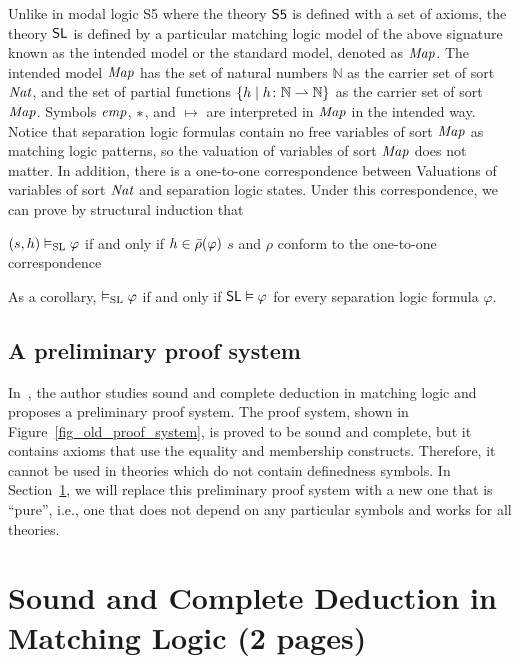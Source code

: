 \documentclass{amsart}
\begin{document}
\newcommand{\N}{\mathbb{N}}

Unlike in modal logic S5 where the theory $\MLSfive$ is defined with a set of
axioms,
the theory $\MLSL$ is defined by 
a particular matching logic model 
of the above signature
known as the intended model or the standard model, denoted as $\Map$.
The intended model $\Map$ has the set of natural numbers $\N$ as the carrier
set of sort $\Nat$,
and the set of partial functions 
$ \{ h \mid h \colon \N \pto \N \} $
as the carrier set of sort $\Map$.
Symbols $\emp$, $\merge$, and $\mapsto$ are interpreted in $\Map$ in the
intended way.
Notice that separation logic formulas contain no free variables of sort $\Map$
as matching logic patterns,
so the valuation of variables of sort $\Map$ does not matter.
In addition, there is a one-to-one correspondence between 
Valuations of variables of sort $\Nat$ and separation logic states.
Under this correspondence, we can prove by structural induction that
\begin{center}
$(s,h) \vDash_\SL \varphi$
 if and only if 
$h \in \barrho(\varphi)$
\quad \doubleslash $s$ and $\rho$ conform to the one-to-one correspondence
\end{center}
As a corollary,
$\vDash_\SL \varphi$ if and only if
$\MLSL \vDash \varphi$ for every separation logic formula $\varphi$.



\subsection{A preliminary proof system}

In~\cite{rosu-2017-lmcs},
the author studies sound and complete deduction in matching logic
and proposes a preliminary proof system.
The proof system, shown in Figure~\ref{fig_old_proof_system},
is proved to be sound and complete, 
but it contains axioms that use the equality and membership constructs.
Therefore, it cannot be used in theories which do not contain 
definedness symbols.
In Section~\ref{sec_pure_matching_logic},
we will replace this preliminary proof system with
a new one that is ``pure'',
i.e., one that
does not depend on any particular symbols and works for all theories.


\section{Sound and Complete Deduction in Matching Logic (2 pages)}
\label{sec_pure_matching_logic}
\end{document}
